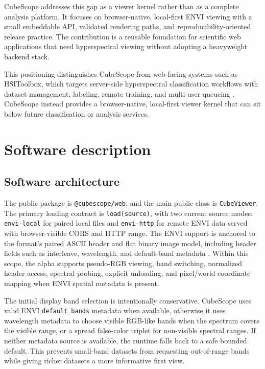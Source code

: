 \documentclass[preprint,12pt,a4paper]{elsarticle}
\begin{document}
CubeScope addresses this gap as a viewer kernel rather than as a complete
analysis platform. It focuses on browser-native, local-first ENVI viewing with
a small embeddable API, validated rendering paths, and reproducibility-oriented
release practice. The contribution is a reusable foundation for scientific web
applications that need hyperspectral viewing without adopting a heavyweight
backend stack.

This positioning distinguishes CubeScope from web-facing systems such as
HSIToolbox, which targets server-side hyperspectral classification workflows
with dataset management, labeling, remote training, and multi-user queueing
\cite{dhaene2023}. CubeScope instead provides a browser-native, local-first
viewer kernel that can sit below future classification or analysis services.

\section{Software description}

\subsection{Software architecture}

The public package is \texttt{@cubescope/web}, and the main public class is
\texttt{CubeViewer}. The primary loading contract is \texttt{load(source)}, with
two current source modes: \texttt{envi-local} for paired local files and
\texttt{envi-http} for remote ENVI data served with browser-visible CORS and
HTTP range. The ENVI support is anchored to the format's paired ASCII header
and flat binary image model, including header fields such as interleave,
wavelength, and default-band metadata \cite{nv5header,nv5image}. Within this
scope, the alpha supports pseudo-RGB viewing, band switching, normalized header
access, spectral probing, explicit unloading, and pixel/world coordinate
mapping when ENVI spatial metadata is present.

The initial display band selection is intentionally conservative. CubeScope
uses valid ENVI \texttt{default bands} metadata when available, otherwise it
uses wavelength metadata to choose visible RGB-like bands when the spectrum
covers the visible range, or a spread false-color triplet for non-visible
spectral ranges. If neither metadata source is available, the runtime falls
back to a safe bounded default. This prevents small-band datasets from
requesting out-of-range bands while giving richer datasets a more informative
first view.
\end{document}
